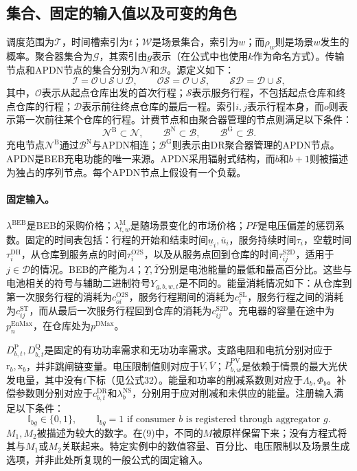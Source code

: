 \documentclass{article}
\begin{document}
\subsection*{集合、固定的输入值以及可变的角色}
调度范围为\(\mathcal T\)，时间槽索引为\(t\)；\(\mathcal W\)是场景集合，索引为\(w\)；而\(\rho_w\)则是场景\(w\)发生的概率。聚合器集合为\(\mathcal G\)，其索引由\(g\)表示（在公式中也使用\(k\)作为命名方式）。传输节点和APDN节点的集合分别为\(\mathcal N\)和\(\mathcal B\)。源定义如下：
\[
\mathcal I=\mathcal O\cup\mathcal S\cup\mathcal D,
\qquad\mathcal{OS}=\mathcal O\cup\mathcal S,
\qquad\mathcal{SD}=\mathcal D\cup\mathcal S,
\]
其中，\(\mathcal O\)表示从起点仓库出发的首次行程；\(\mathcal S\)表示服务行程，不包括起点仓库和终点仓库的行程；\(\mathcal D\)表示前往终点仓库的最后一程。索引\(i,j\)表示行程本身，而\(o\)则表示第一次前往某个仓库的行程。计费节点和由聚合器管理的节点则满足以下条件：
\[
\mathcal N^{\mathrm B}\subset\mathcal N,
\qquad\mathcal B^{\mathrm N}\subset\mathcal B,
\qquad\mathcal B^{\mathrm G}\subset\mathcal B.
\]
充电节点\(\mathcal N^{\mathrm B}\)通过\(\mathcal B^{\mathrm N}\)与APDN相连；\(\mathcal B^{\mathrm G}\)则表示由DR聚合器管理的APDN节点。APDN是BEB充电功能的唯一来源。APDN采用辐射式结构，而\(b\)和\(b+1\)则被描述为独占的序列节点。每个APDN节点上假设有一个负载。

\paragraph{固定输入。}
\(\lambda^{\mathrm{BEB}}\)是BEB的采购价格；\(\lambda^{\mathrm M}_{t,w}\)是随场景变化的市场价格；\(PF\)是电压偏差的惩罚系数。固定的时间表包括：行程的开始和结束时间\(\underline u_i,\overline u_i\)，服务持续时间\(\tau_i\)，空载时间\(\tau_i^{\mathrm{DH}}\)，从仓库到服务点的时间\(\tau_i^{\mathrm{O2S}}\)，以及从服务点回到仓库的时间\(\tau_{ij}^{\mathrm{S2D}}\)，适用于\(j\in\mathcal D\)的情况。BEB的产能为\(A\)；\(\underline\Upsilon,\overline\Upsilon\)分别是电池能量的最低和最高百分比。这些与电池相关的符号与辅助二进制符号\(Y_{g,b,w,t}\)是不同的。能量消耗情况如下：从仓库到第一次服务行程的消耗为\(c^{\mathrm{O2S}}_{oi}\)，服务行程期间的消耗为\(c_i^{\mathrm{SL}}\)，服务行程之间的消耗为\(c^{\mathrm{ST}}_{ij}\)，而从最后一次服务行程回到仓库的消耗为\(c^{\mathrm{S2D}}_{ij}\)。充电器的容量在途中为\(p_n^{\mathrm{EnMax}}\)，在仓库处为\(p^{\mathrm{DMax}}\)。

\(D^{\mathrm P}_{b,t},D^{\mathrm Q}_{b,t}\)是固定的有功功率需求和无功功率需求。支路电阻和电抗分别对应于\(\mathrm r_b,\mathrm x_b\)，并非跳闸链变量。电压限制值则对应于\(\underline V,\overline V\)；\(\overline P^{\mathrm{PV}}_{b,w}\)是依赖于情景的最大光伏发电量，其中没有\(t\)下标（见公式32）。能量和功率的削减系数则对应于\(\Lambda_b,\Phi_b\)。补偿参数则分别对应于\(c^{\mathrm{DR}}_{b,t}\)和\(\lambda^{\mathrm{NS}}_b\)，分别用于应对削减和未供应的能量。注册输入满足以下条件：
\[
\mathbb I_{bg}\in\{0,1\},\qquad
\mathbb I_{bg}=1\text{ if consumer }b\text{ is registered through aggregator }g.
\]
\(M_1,M_2\)被描述为较大的数字。在(9)中，不同的\(M\)被原样保留下来；没有方程式将其与\(M_1\)或\(M_2\)关联起来。特定实例中的数值容量、百分比、电压限制以及场景生成选项，并非此处所复现的一般公式的固定输入。
\end{document}
